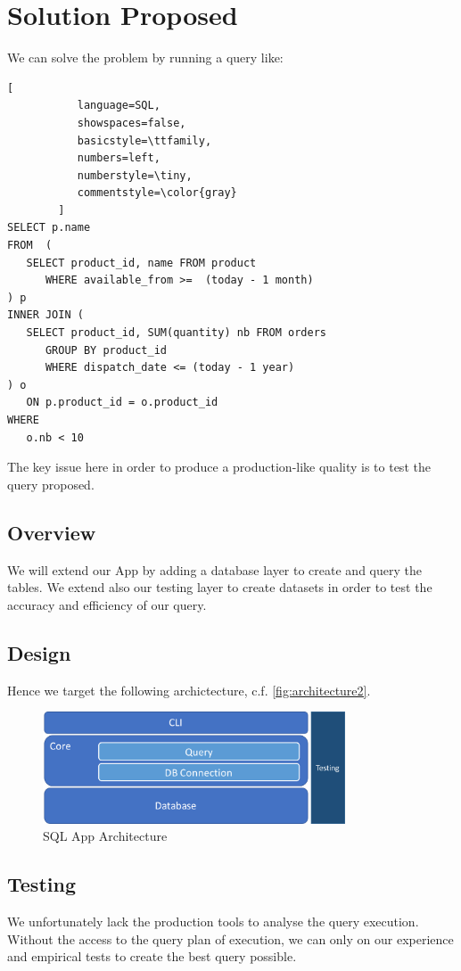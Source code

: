 \documentclass[12pt,a4paper,article]{memoir} %
\begin{document}
\section{Solution Proposed}
We can solve the problem by running a query like:
\begin{lstlisting}[
           language=SQL,
           showspaces=false,
           basicstyle=\ttfamily,
           numbers=left,
           numberstyle=\tiny,
           commentstyle=\color{gray}
        ]
SELECT p.name
FROM  (
   SELECT product_id, name FROM product 
      WHERE available_from >=  (today - 1 month)
) p
INNER JOIN (
   SELECT product_id, SUM(quantity) nb FROM orders
      GROUP BY product_id
      WHERE dispatch_date <= (today - 1 year)
) o
   ON p.product_id = o.product_id
WHERE 
   o.nb < 10
\end{lstlisting}

The key issue here in order to produce a production-like quality is 
to test the query proposed.

\subsection{Overview}
We will extend our App by adding a database layer to create and query 
the tables.
We extend also our testing layer to create datasets in order to test
the accuracy and efficiency of our query.

\subsection{Design}
Hence we target the following archictecture, c.f. \autoref{fig:architecture2}.
\begin{figure}[h!]
\begin{center}
\includegraphics[width=0.8\textwidth]{img/architecture2.png}
\caption{SQL App Architecture}
\label{fig:architecture2}
\end{center}
\end{figure}

\subsection{Testing}
We unfortunately lack the production tools to analyse the query execution.
Without the access to the query plan of execution, we can only on our
experience and empirical tests to create the best query possible.
\end{document}
